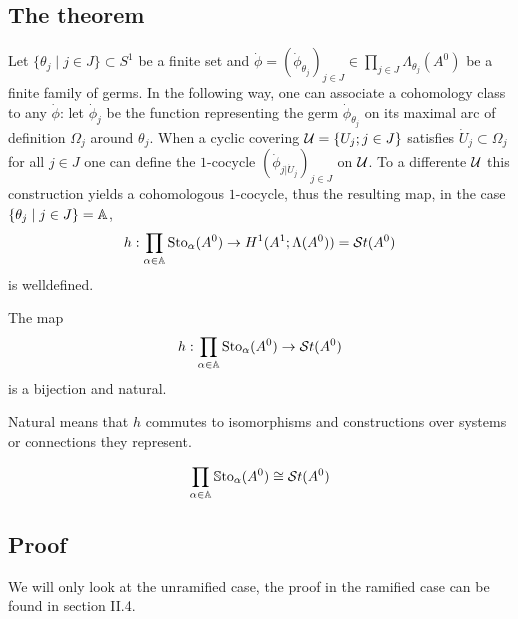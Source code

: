\subsection{The theorem}
Let $\{\theta_j\mid j\in J\}\subset S^1$ be a finite set and
$\dot\phi=(\dot\phi_{\theta_j})_{j\in J}\in\prod_{j\in J}\Lambda_{\theta_j}(A^0)$
be a finite family of germs.
In the following way, one can associate a cohomology class to any $\dot\phi$:
let $\dot\phi_j$ be the function representing the germ $\dot\phi_{\theta_j}$ on
its maximal arc of definition $\Omega_j$ around $\theta_j$.
When a cyclic covering $\mathcal{U}=\{U_j;j\in J\}$ satisfies
$\dot U_j\subset \Omega_j$ for all $j\in J$ one can define the $1$-cocycle
$(\dot\phi_{j|\dot U_j})_{j\in J}$ on $\mathcal{U}$.
To a differente $\mathcal{U}$ this construction yields a cohomologous
$1$-cocycle\TODO[Proof], thus the resulting map, in the case
$\{\theta_j\mid j\in J\}=\mathbb{A}$,
\[
  h:\prod_{\alpha\in\mathbb{A}}\operatorname{Sto}_\alpha(A^0)\to
  H^1(A^1;\Lambda(A^0))=\mathcal{S}{}t(A^0)
\]
is welldefined.
\begin{tthm}
  \label{thm:mainThm2}
  The map
  \[
    h:\prod_{\alpha\in\mathbb{A}}\operatorname{Sto}_\alpha(A^0)\to\mathcal{S}{}t(A^0)
  \]
  is a bijection and natural.
  \begin{rem}
    Natural means that $h$ commutes to isomorphisms and constructions over
    systems or connections they represent.
    \begin{comment}
      See \cite{Loday1994} Section III.3.3
    \end{comment}
  \end{rem}
\end{tthm}
\begin{cor}
  \[
    \prod_{\alpha\in\mathbb{A}}\operatorname{\mathbb{S}to}_\alpha(A^0)\cong\mathcal{S}{}t(A^0)
  \]
\end{cor}
\subsection{Proof}
We will only look at the unramified case, the proof in the ramified case can be
found in \cite{Loday1994} section II.4.

